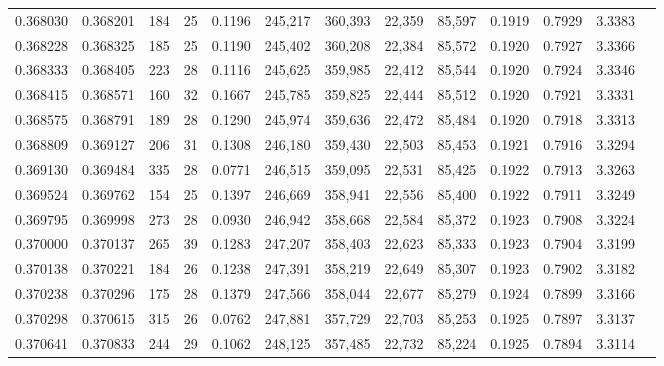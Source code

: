 \begin{tabular}{rrrrrrrrrrrrr}
0.368030 & 0.368201 &    184 &    25 &                                     0.1196 & 245,217 & 360,393 &  22,359 &  85,597 & 0.1919 & 0.7929 & 3.3383 \\
0.368228 & 0.368325 &    185 &    25 &                                     0.1190 & 245,402 & 360,208 &  22,384 &  85,572 & 0.1920 & 0.7927 & 3.3366 \\
0.368333 & 0.368405 &    223 &    28 &                                     0.1116 & 245,625 & 359,985 &  22,412 &  85,544 & 0.1920 & 0.7924 & 3.3346 \\
0.368415 & 0.368571 &    160 &    32 &                                     0.1667 & 245,785 & 359,825 &  22,444 &  85,512 & 0.1920 & 0.7921 & 3.3331 \\
0.368575 & 0.368791 &    189 &    28 &                                     0.1290 & 245,974 & 359,636 &  22,472 &  85,484 & 0.1920 & 0.7918 & 3.3313 \\
0.368809 & 0.369127 &    206 &    31 &                                     0.1308 & 246,180 & 359,430 &  22,503 &  85,453 & 0.1921 & 0.7916 & 3.3294 \\
0.369130 & 0.369484 &    335 &    28 &                                     0.0771 & 246,515 & 359,095 &  22,531 &  85,425 & 0.1922 & 0.7913 & 3.3263 \\
0.369524 & 0.369762 &    154 &    25 &                                     0.1397 & 246,669 & 358,941 &  22,556 &  85,400 & 0.1922 & 0.7911 & 3.3249 \\
0.369795 & 0.369998 &    273 &    28 &                                     0.0930 & 246,942 & 358,668 &  22,584 &  85,372 & 0.1923 & 0.7908 & 3.3224 \\
0.370000 & 0.370137 &    265 &    39 &                                     0.1283 & 247,207 & 358,403 &  22,623 &  85,333 & 0.1923 & 0.7904 & 3.3199 \\
0.370138 & 0.370221 &    184 &    26 &                                     0.1238 & 247,391 & 358,219 &  22,649 &  85,307 & 0.1923 & 0.7902 & 3.3182 \\
0.370238 & 0.370296 &    175 &    28 &                                     0.1379 & 247,566 & 358,044 &  22,677 &  85,279 & 0.1924 & 0.7899 & 3.3166 \\
0.370298 & 0.370615 &    315 &    26 &                                     0.0762 & 247,881 & 357,729 &  22,703 &  85,253 & 0.1925 & 0.7897 & 3.3137 \\
0.370641 & 0.370833 &    244 &    29 &                                     0.1062 & 248,125 & 357,485 &  22,732 &  85,224 & 0.1925 & 0.7894 & 3.3114 \\

\end{tabular}
